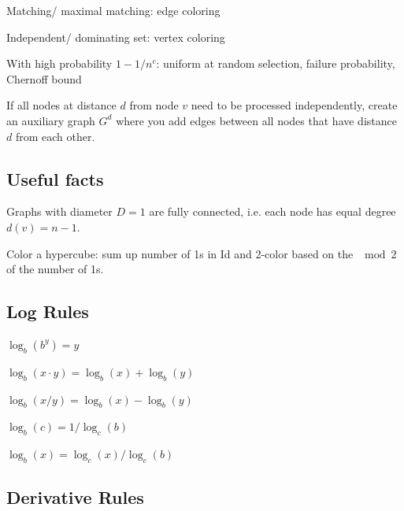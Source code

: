 \documentclass[a4paper, 8pt, landscape]{scrartcl}
\begin{document}
\begin{multicols*}{3}
\begin{compactitem}
\item Matching/ maximal matching: edge coloring

\item Independent/ dominating set: vertex coloring

\item With high probability $1-1/n^c$: uniform at random selection, failure probability, Chernoff bound

\item If all nodes at distance $d$ from node $v$ need to be processed independently, create an auxiliary graph $G^d$ where you add edges between all nodes that have distance $d$ from each other.
\end{compactitem}


\subsection{Useful facts}

\begin{compactitem}
\item Graphs with diameter $D = 1$ are fully connected, i.e. each node has equal degree $d(v) = n-1$.

\item Color a hypercube: sum up number of 1s in Id and 2-color based on the $\mod 2$ of the number of 1s.
\end{compactitem}

\columnbreak

\subsection{Log Rules}

\begin{compactitem}
\item $\log_b(b^y) = y$

\item $\log_b(x \cdot y) = \log_b(x) + \log_b(y)$

\item $\log_b(x / y) = \log_b(x) - \log_b(y)$

\item $\log_b(c) = 1 / \log_c(b)$

\item $\log_b(x) = \log_c(x) / \log_c(b)$
\end{compactitem}

\subsection{Derivative Rules}


\end{multicols*}
\end{document}
